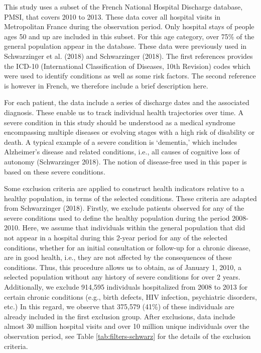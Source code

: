 \documentclass{article}
\begin{document}
This study uses a subset of the French National Hospital Discharge
database, PMSI, that covers 2010 to 2013. These data cover all hospital
visits in Metropolitan France during the observation period. Only
hospital stays of people ages 50 and up are included in this subset. For
this age category, over 75\% of the general population appear in the
database. These data were previously used in Schwarzinger et al. (2018)
and Schwarzinger (2018). The first references provides the ICD-10
(International Classification of Diseases, 10th Revision) codes which
were used to identify conditions as well as some risk factors. The
second reference is however in French, we therefore include a brief
description here.

For each patient, the data include a series of discharge dates and the
associated diagnosis. These enable us to track individual health
trajectories over time. A severe condition in this study should be
understood as a medical syndrome encompassing multiple diseases or
evolving stages with a high risk of disability or death. A typical
example of a severe condition is `dementia,' which includes Alzheimer's
disease and related conditions, i.e., all causes of cognitive loss of
autonomy (Schwarzinger 2018). The notion of disease-free used in this
paper is based on these severe conditions.

Some exclusion criteria are applied to construct health indicators
relative to a healthy population, in terms of the selected conditions.
These criteria are adapted from Schwarzinger (2018). Firstly, we exclude
patients observed for any of the severe conditions used to define the
healthy population during the period 2008-2010. Here, we assume that
individuals within the general population that did not appear in a
hospital during this 2-year period for any of the selected conditions,
whether for an initial consultation or follow-up for a chronic disease,
are in good health, i.e., they are not affected by the consequences of
these conditions. Thus, this procedure allows us to obtain, as of
January 1, 2010, a selected population without any history of severe
conditions for over 2 years. Additionally, we exclude 914,595
individuals hospitalized from 2008 to 2013 for certain chronic
conditions (e.g., birth defects, HIV infection, psychiatric disorders,
etc.) In this regard, we observe that 375,579 (41\%) of these
individuals are already included in the first exclusion group. After
exclusions, data include almost 30 million hospital visits and over 10
million unique individuals over the observation period, see Table
\ref{tab:filters-schwarz} for the details of the exclusion criteria.
\end{document}
